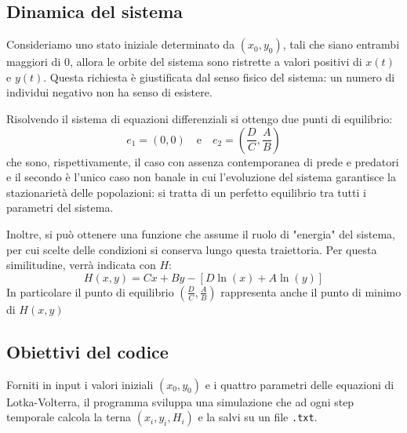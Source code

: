 \subsection{Dinamica del sistema}
Consideriamo uno stato iniziale determinato da $(x_0, y_0)$, tali che siano entrambi maggiori di 0, allora le orbite del sistema sono ristrette a valori positivi di $x(t)$ e $y(t)$. Questa richiesta è giustificata dal senso fisico del sistema: un numero di individui negativo non ha senso di esistere.

\par Risolvendo il sistema di equazioni differenziali si ottengo due punti di equilibrio:
\[
    e_1 = (0,0) \quad \mathrm{e} \quad e_2 = \left(\frac{D}{C}, \frac{A}{B} \right)
\]
che sono, rispettivamente, il caso con assenza contemporanea di prede e predatori e il secondo è l'unico caso non banale in cui l'evoluzione del sistema garantisce la stazionarietà delle popolazioni: si tratta di un perfetto equilibrio tra tutti i parametri del sistema.

Inoltre, si può ottenere una funzione che assume il ruolo di "energia" del sistema, per cui scelte delle condizioni si conserva lungo questa traiettoria. Per questa similitudine, verrà indicata con $H$:
\[
    H(x,y) = C x + B y - \left[D \ln(x) + A \ln(y)\right]
\]
In particolare il punto di equilibrio $\left(\frac{D}{C}, \frac{A}{B} \right)$ rappresenta anche il punto di minimo di $H(x,y)$

\subsection{Obiettivi del codice}
Forniti in input i valori iniziali $(x_0,y_0)$ e i quattro parametri delle equazioni di Lotka-Volterra, il programma sviluppa una simulazione che ad ogni step temporale calcola la terna $(x_i, y_i, H_i)$ e la salvi su un file \verb|.txt|.
